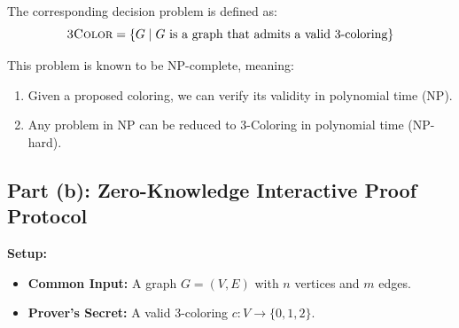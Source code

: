 \documentclass[11pt]{article}
\begin{document}
The corresponding decision problem is defined as:
\[
\textsc{3Color} = \{ G \mid G \text{ is a graph that admits a valid 3-coloring} \}
\]

This problem is known to be NP-complete, meaning:
\begin{enumerate}
    \item Given a proposed coloring, we can verify its validity in polynomial time (NP).
    \item Any problem in NP can be reduced to 3-Coloring in polynomial time (NP-hard).
\end{enumerate}

\subsection{Part (b): Zero-Knowledge Interactive Proof Protocol}

\textbf{Setup:}
\begin{itemize}
    \item \textbf{Common Input:} A graph $G = (V, E)$ with $n$ vertices and $m$ edges.
    \item \textbf{Prover's Secret:} A valid 3-coloring $c: V \to \{0, 1, 2\}$.
\end{itemize}
\end{document}
